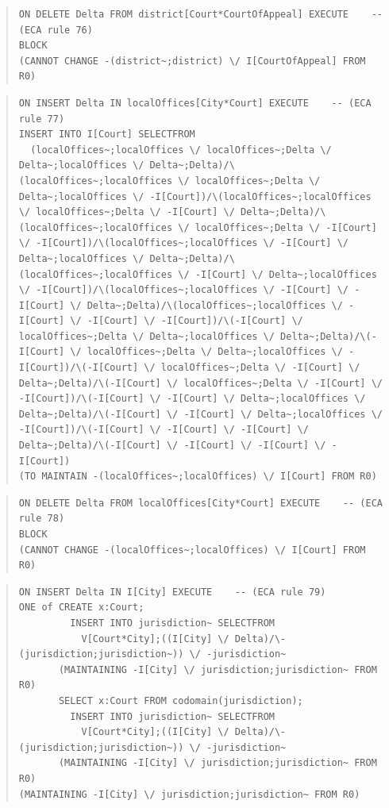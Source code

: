 \documentclass[10pt,a4paper]{report}              %
\theoremstyle{plain}\theorembodyfont{\rmfamily}\newtheorem{definition}{Definition}[section]
\theoremstyle{plain}\theorembodyfont{\rmfamily}\newtheorem{designrule}[definition]{Requirement}
\begin{document}
\begin{quote}
\begin{verbatim}
ON DELETE Delta FROM district[Court*CourtOfAppeal] EXECUTE    -- (ECA rule 76)
BLOCK
(CANNOT CHANGE -(district~;district) \/ I[CourtOfAppeal] FROM R0)
\end{verbatim}
\end{quote}
\begin{quote}
\begin{verbatim}
ON INSERT Delta IN localOffices[City*Court] EXECUTE    -- (ECA rule 77)
INSERT INTO I[Court] SELECTFROM
  (localOffices~;localOffices \/ localOffices~;Delta \/ Delta~;localOffices \/ Delta~;Delta)/\(localOffices~;localOffices \/ localOffices~;Delta \/ Delta~;localOffices \/ -I[Court])/\(localOffices~;localOffices \/ localOffices~;Delta \/ -I[Court] \/ Delta~;Delta)/\(localOffices~;localOffices \/ localOffices~;Delta \/ -I[Court] \/ -I[Court])/\(localOffices~;localOffices \/ -I[Court] \/ Delta~;localOffices \/ Delta~;Delta)/\(localOffices~;localOffices \/ -I[Court] \/ Delta~;localOffices \/ -I[Court])/\(localOffices~;localOffices \/ -I[Court] \/ -I[Court] \/ Delta~;Delta)/\(localOffices~;localOffices \/ -I[Court] \/ -I[Court] \/ -I[Court])/\(-I[Court] \/ localOffices~;Delta \/ Delta~;localOffices \/ Delta~;Delta)/\(-I[Court] \/ localOffices~;Delta \/ Delta~;localOffices \/ -I[Court])/\(-I[Court] \/ localOffices~;Delta \/ -I[Court] \/ Delta~;Delta)/\(-I[Court] \/ localOffices~;Delta \/ -I[Court] \/ -I[Court])/\(-I[Court] \/ -I[Court] \/ Delta~;localOffices \/ Delta~;Delta)/\(-I[Court] \/ -I[Court] \/ Delta~;localOffices \/ -I[Court])/\(-I[Court] \/ -I[Court] \/ -I[Court] \/ Delta~;Delta)/\(-I[Court] \/ -I[Court] \/ -I[Court] \/ -I[Court])
(TO MAINTAIN -(localOffices~;localOffices) \/ I[Court] FROM R0)
\end{verbatim}
\end{quote}
\begin{quote}
\begin{verbatim}
ON DELETE Delta FROM localOffices[City*Court] EXECUTE    -- (ECA rule 78)
BLOCK
(CANNOT CHANGE -(localOffices~;localOffices) \/ I[Court] FROM R0)
\end{verbatim}
\end{quote}
\begin{quote}
\begin{verbatim}
ON INSERT Delta IN I[City] EXECUTE    -- (ECA rule 79)
ONE of CREATE x:Court;
         INSERT INTO jurisdiction~ SELECTFROM
           V[Court*City];((I[City] \/ Delta)/\-(jurisdiction;jurisdiction~)) \/ -jurisdiction~
       (MAINTAINING -I[City] \/ jurisdiction;jurisdiction~ FROM R0)
       SELECT x:Court FROM codomain(jurisdiction);
         INSERT INTO jurisdiction~ SELECTFROM
           V[Court*City];((I[City] \/ Delta)/\-(jurisdiction;jurisdiction~)) \/ -jurisdiction~
       (MAINTAINING -I[City] \/ jurisdiction;jurisdiction~ FROM R0)
(MAINTAINING -I[City] \/ jurisdiction;jurisdiction~ FROM R0)
\end{verbatim}
\end{quote}
\end{document}
